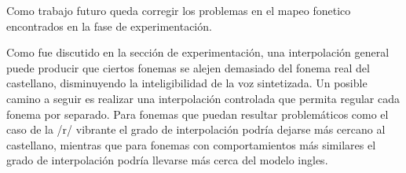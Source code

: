 Como trabajo futuro queda corregir los problemas en el mapeo fonetico encontrados en la fase de experimentación.

Como fue discutido en la sección de experimentación, una interpolación general puede producir que ciertos fonemas se alejen demasiado del fonema real del castellano, disminuyendo la inteligibilidad de la voz sintetizada. Un posible camino a seguir es realizar una interpolación controlada que permita regular cada fonema por separado. Para fonemas que puedan resultar problemáticos como el caso de la /r/ vibrante el grado de interpolación podría dejarse más cercano al castellano, mientras que para fonemas con comportamientos más similares el grado de interpolación podría llevarse más cerca del modelo ingles.




